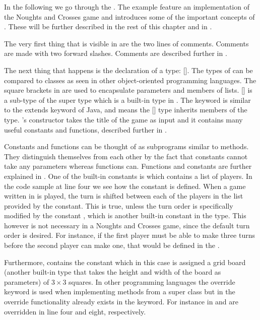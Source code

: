 In the following we go through the . The example feature
an implementation of the Noughts and Crosses game and introduces some of the important concepts of \productname{}. These will be
further described in the rest of this chapter and in .

The very first thing that is visible in  are the
two lines of comments. Comments are made with two forward slashes. Comments are
described further in .

The next thing that happens is the declaration of a type: 
[].  The types of \productname{} can be compared to classes as
seen in other object-oriented programming languages. The square brackets in
\productname{} are used to encapsulate parameters and members
of lists.  [] is a sub-type of the super type 
which is a built-in type in \productname{}. The  keyword is
similar to the extends keyword of Java, and means the [] type
inherits members of the  type.  's constructor takes the
title of the game as input and it contains many useful constants and
functions, described further in . 


Constants and functions can be thought of as subprograms similar to methods.
They distinguish themselves from each other by the fact that constants cannot
take any parameters whereas functions can. Functions and constants are further
explained in . One of the built-in constants is
 which contains a list of players. In the code sample at line
four we see how the constant is defined. When a game written in
\productname{} is played, the turn is shifted between each of the players in
the list provided by the  constant. This is true, unless the turn
order is specifically modified by the constant , which is
another built-in constant in the  type. This however is not necessary
in a Noughts and Crosses game, since the default turn order is desired. For instance,
if the first player must be able to make three turns before the second player
can make one, that would be defined in the .

Furthermore,  contains the constant  which in
this case is assigned a grid board (another built-in type that takes the height
and width of the board as parameters) of $3 \times 3$ squares. In other
programming languages the override keyword is used when implementing methods
from a super class but in \productname{} the override functionality 
already exists in the  keyword. For instance in
  and  are
overridden in line four and eight, respectively.

